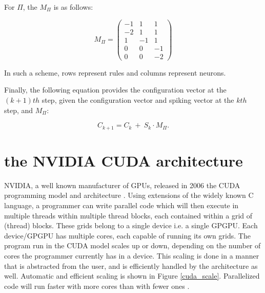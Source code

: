 \documentclass{acm_proc_article-sp}
\begin{document}
For $\Pi$, the $M_{\Pi}$ is as follows:

\begin{equation}\label{snp_mat}
M_{\Pi} = \left(
\begin{array}{ccc}
  -1 & 1 & 1\\
  -2 & 1 &  1 \\
   1 &  -1 & 1 \\
   0 & 0 & -1\\
   0 & 0& -2
\end{array}\right)
\end{equation}

In such a scheme, rows represent rules and columns
represent neurons.

Finally, the following equation provides the configuration
vector at the $(k+1)th$ step, given the configuration vector and
spiking vector at the $kth$ step, and $M_{\Pi}$:

\begin{equation}\label{next-config}
C_{k+1} =  C_{k} ~ + ~ S_{k}\cdot M_{\Pi}.
\end{equation}


\section{the NVIDIA CUDA architecture}

NVIDIA, a well known manufacturer of GPUs, released in
2006 the CUDA programming model and architecture \cite{cudapage}.
Using extensions of the widely known C language, a
programmer can write parallel code which will then execute
in multiple threads within multiple thread blocks, each
contained within a grid of (thread) blocks. These grids
belong to a single device i.e. a single GPGPU. Each
device/GPGPU has multiple cores, each capable of running
its own grids. The program run in the CUDA model scales
up or down, depending on the number of cores the
programmer currently has in a device. This scaling is done
in a manner that is abstracted from the user, and is
efficiently handled by the architecture as well. Automatic and efficient scaling is shown
in Figure \ref{cuda_scale}. Parallelized code will run faster with more cores
than with fewer ones \cite{cudaguide}.
\end{document}
